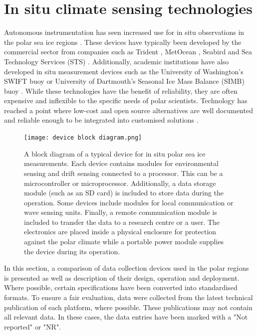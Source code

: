 \section{In situ climate sensing technologies}

Autonomous instrumentation has seen increased use for in situ observations in the polar sea ice regions \cite{kennicutt2016delivering}. These devices have typically  been developed by the commercial sector \cite{rabault2017measurements} from companies such as Trident \cite{trident}, MetOcean \cite{uptempo}, Seabird \cite{seabird2021website} and Sea Technology Services (STS) \cite{sts2021website}. Additionally, academic institutions have also developed in situ measurement devices such as the University of Washington's SWIFT buoy \cite{thomson2012wave} or University of Dartmouth's Seasonal Ice Mass Balance (SIMB) buoy \cite{polashenski2011seasonal}. While these technologies have the benefit of reliability, they are often expensive \cite{rabault2017measurements} and inflexible to the specific needs of polar scientists. Technology has reached a point where low-cost and open source alternatives are well documented and reliable enough to be integrated into customised solutions \cite{rabault2019open}.\par 

\begin{figure}[H]
	\centering
	\texttt{[image: device block diagram.png]}
	\caption{A block diagram of a typical device for in situ polar sea ice measurements. Each device contains modules for environmental sensing and drift sensing connected to a processor. This can be a microcontroller or microprocessor. Additionally, a data storage module (such as an SD card) is included to store data during the operation. Some devices include modules for local communication or wave sensing units. Finally, a remote communication module is included to transfer the data to a research centre or a user. The electronics are placed inside a physical enclosure for protection against the polar climate while a portable power module supplies the device during its operation.}
	\label{fig:devblockdiag}
\end{figure}

In this section, a comparison of data collection devices used in the polar regions is presented as well as  description of their design, operation and deployment. Where possible, certain specifications have been converted into standardised formats. To ensure a fair evaluation, data were collected from the latest technical publication of each platform, where possible. These publications may not contain all relevant data. In these cases, the data entries have been marked with a "Not reported" or "NR". 


